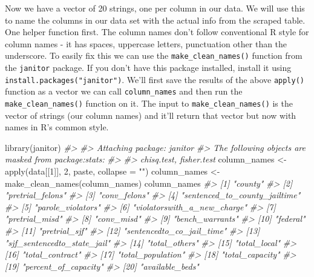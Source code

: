 \documentclass[
  12pt,
  openany]{book}
\newenvironment{Shaded}{\begin{snugshade}}{\end{snugshade}}
\newcommand{\AttributeTok}[1]{\textcolor[rgb]{0.61,0.61,0.61}{#1}}
\newcommand{\CommentTok}[1]{\textcolor[rgb]{0.37,0.37,0.37}{\textit{#1}}}
\newcommand{\DecValTok}[1]{\textcolor[rgb]{0.06,0.06,0.06}{#1}}
\newcommand{\FunctionTok}[1]{\textcolor[rgb]{0,0,0}{#1}}
\newcommand{\NormalTok}[1]{#1}
\newcommand{\OtherTok}[1]{\textcolor[rgb]{0.37,0.37,0.37}{#1}}
\newcommand{\StringTok}[1]{\textcolor[rgb]{0.5,0.5,0.5}{#1}}
\begin{document}
Now we have a vector of 20 strings, one per column in our data. We will use this to name the columns in our data set with the actual info from the scraped table. One helper function first. The column names don't follow conventional R style for column names - it has spaces, uppercase letters, punctuation other than the underscore. To easily fix this we can use the \texttt{make\_clean\_names()} function from the \texttt{janitor} package. If you don't have this package installed, install it using \texttt{install.packages("janitor")}. We'll first save the results of the above \texttt{apply()} function as a vector we can call \texttt{column\_names} and then run the \texttt{make\_clean\_names()} function on it. The input to \texttt{make\_clean\_names()} is the vector of strings (our column names) and it'll return that vector but now with names in R's common style.

\begin{Shaded}
\begin{Highlighting}[]
\FunctionTok{library}\NormalTok{(janitor)}
\CommentTok{\#\textgreater{} }
\CommentTok{\#\textgreater{} Attaching package: \textquotesingle{}janitor\textquotesingle{}}
\CommentTok{\#\textgreater{} The following objects are masked from \textquotesingle{}package:stats\textquotesingle{}:}
\CommentTok{\#\textgreater{} }
\CommentTok{\#\textgreater{}     chisq.test, fisher.test}
\NormalTok{column\_names }\OtherTok{\textless{}{-}} \FunctionTok{apply}\NormalTok{(data[[}\DecValTok{1}\NormalTok{]], }\DecValTok{2}\NormalTok{, paste, }\AttributeTok{collapse =} \StringTok{""}\NormalTok{)}
\NormalTok{column\_names }\OtherTok{\textless{}{-}} \FunctionTok{make\_clean\_names}\NormalTok{(column\_names)}
\NormalTok{column\_names}
\CommentTok{\#\textgreater{}  [1] "county"                      }
\CommentTok{\#\textgreater{}  [2] "pretrial\_felons"             }
\CommentTok{\#\textgreater{}  [3] "conv\_felons"                 }
\CommentTok{\#\textgreater{}  [4] "sentenced\_to\_county\_jailtime"}
\CommentTok{\#\textgreater{}  [5] "parole\_violators"            }
\CommentTok{\#\textgreater{}  [6] "violatorswith\_a\_new\_charge"  }
\CommentTok{\#\textgreater{}  [7] "pretrial\_misd"               }
\CommentTok{\#\textgreater{}  [8] "conv\_misd"                   }
\CommentTok{\#\textgreater{}  [9] "bench\_warrants"              }
\CommentTok{\#\textgreater{} [10] "federal"                     }
\CommentTok{\#\textgreater{} [11] "pretrial\_sjf"                }
\CommentTok{\#\textgreater{} [12] "sentencedto\_co\_jail\_time"    }
\CommentTok{\#\textgreater{} [13] "sjf\_sentencedto\_state\_jail"  }
\CommentTok{\#\textgreater{} [14] "total\_others"                }
\CommentTok{\#\textgreater{} [15] "total\_local"                 }
\CommentTok{\#\textgreater{} [16] "total\_contract"              }
\CommentTok{\#\textgreater{} [17] "total\_population"            }
\CommentTok{\#\textgreater{} [18] "total\_capacity"              }
\CommentTok{\#\textgreater{} [19] "percent\_of\_capacity"         }
\CommentTok{\#\textgreater{} [20] "available\_beds"}
\end{Highlighting}
\end{Shaded}
\end{document}

